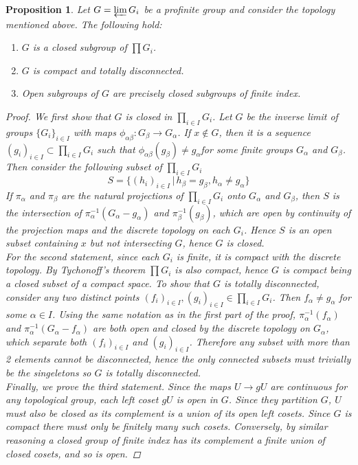 \documentclass{article}
\theoremstyle{definition}
\theoremstyle{remark}
\theoremstyle{plain}
\newtheorem{proposition}[theorem]{Proposition}
\begin{document}
\begin{proposition}
	Let $G = \varprojlim G_i$ be a profinite group and consider the topology mentioned above.
	The following hold:
	\begin{enumerate}
		\item $G$ is a closed subgroup of $\prod G_i$.
		\item $G$ is compact and totally disconnected.
		\item Open subgroups of $G$ are precisely closed subgroups of finite index.
	\end{enumerate}
	
	\begin{proof}
		We first show that $G$ is closed in $\prod_{i \in I} G_i$.
		Let $G$ be the inverse limit of groups $\{G_i\}_{i \in I}$ with maps $\phi_{\alpha \beta}: G_{\beta} \to G_{\alpha}$. 
		If $x \notin G$, then it is a sequence $(g_i)_{i \in I} \subset \prod_{i \in I} G_i$ such that $\phi_{\alpha \beta} (g_{\beta}) \neq g_{\alpha}$for some finite groups $G_{\alpha}$ and $G_{\beta}$.
		Then consider the following subset of $\prod_{i \in I} G_i$
		\[S  = \{(h_i)_{i \in I} \,|\, h_{\beta} = g_{\beta}, h_{\alpha} \neq g_{\alpha}\}\]
		If $\pi_{\alpha}$ and $\pi_{\beta}$ are the natural projections of $\prod_{i \in I} G_i$ onto $G_{\alpha}$ and $G_{\beta}$, then $S$ is the intersection of $\pi_{\alpha}^{-1}(G_{\alpha} - g_{\alpha})$ and $\pi_{\beta}^{-1}(g_{\beta})$, which are open by continuity of the projection maps and the discrete topology on each $G_i$.
Hence $S$ is an open subset containing $x$ but not intersecting $G$, hence $G$ is closed.\\
\indent For the second statement, since each $G_i$ is finite, it is compact with the discrete topology.
By Tychonoff's theorem $\prod G_i$ is also compact, hence $G$ is compact being a closed subset of a compact space.
To show that $G$ is totally disconnected, consider any two distinct points $(f_i)_{i \in I}, (g_i)_{i \in I} \in \prod_{i \in I} G_i$.
Then $f_{\alpha} \neq g_{\alpha}$ for some $\alpha \in I$.
Using the same notation as in the first part of the proof, $\pi_{\alpha}^{-1}(f_{\alpha})$ and $\pi_{\alpha}^{-1}(G_{\alpha} - f_{\alpha})$ are both open and closed by the discrete topology on $G_{\alpha}$, which separate both $(f_i)_{i \in I}$ and $(g_i)_{i \in I}$.
Therefore any subset with more than 2 elements cannot be disconnected, hence the only connected subsets must trivially be the singeletons so $G$ is totally disconnected.\\
\indent Finally, we prove the third statement.
Since the maps $U \to gU$ are continuous for any topological group, each left coset $gU$ is open in $G$.
Since they partition $G$, $U$ must also be closed as its complement is a union of its open left cosets.
Since $G$ is compact there must only be finitely many such cosets.
Conversely, by similar reasoning a closed group of finite index has its complement a finite union of closed cosets, and so is open.
\end{proof}
	
\end{proposition}
\end{document}
